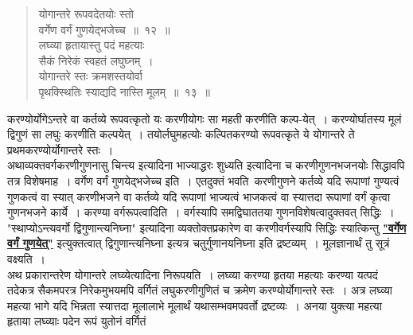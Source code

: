 \documentclass[11pt, openany]{book}
\begin{document}
 \label{12}
\begin{quote}
    \bs
  योगान्तरे रूपवदेतयोः स्तो \\

 \vspace{-7mm}
\hspace{1cm} वर्गेण वर्गं गुणयेद्भजेच्च~॥~१२~॥\\

 \vspace{-5mm}
 लघ्व्या हृतायास्तु पदं महत्याः \\

 \vspace{-7mm}
\hspace{1cm} सैकं निरेकं स्वहतं लघुघ्नम्~। \\

 \vspace{-7mm}
 योगान्तरे स्तः क्रमशस्तयोर्वा \\

 \vspace{-7mm}
\hspace{1cm} पृथक्स्थितिः स्याद्यदि नास्ति मूलम्~॥~१३~॥
\end{quote}

 करण्योर्योगेऽन्तरे वा कर्तव्ये रूपवत्कृतो यः करणीयोगः सा महती 
करणीति कल्प-येत्~। करण्योर्घातस्य मूलं द्विगुणं सा लघुः करणीति कल्पयेत्~।
तयोर्लघुमहत्योः कल्पितकरण्यो रूपवत्कृते ये योगान्तरे ते प्रथमकरण्योर्योगान्तरे स्तः~। \\

\vspace{-3mm}
 अथाव्यक्तवर्गकरणीगुणनासु चिन्त्य इत्यादिना भाज्याद्धरः शुध्यति
इत्यादिना च करणीगुणनभजनयोः सिद्धावपि तत्र विशेषमाह~। वर्गेण वर्गं गुणयेद्भजेच्च इति~। एतदुक्तं भवति\textendash\, करणीगुणने कर्तव्ये यदि रूपाणां
गुण्यत्वं गुणकत्वं वा स्यात् करणीभजने वा कर्तव्ये यदि रूपाणां भाज्यत्वं भाजकत्वं वा स्यात्तदा रूपाणां वर्गं कृत्वा गुणनभजने कार्ये~। करण्या वर्गरूपत्वादिति~।
वर्गस्यापि समद्विघाततया गुणनविशेषत्वादुक्तवत् सिद्धिः~। {\qt "स्थाप्योऽन्त्यवर्गो
द्विगुणान्त्यनिघ्ना"} इत्यादिना व्यक्तोक्तप्रकारेण वा करणीवर्गस्यापि सिद्धिः
स्यात्किन्तु \hyperref[12]{\textbf{"वर्गेण वर्गं गुणयेत्"}} इत्युक्तत्वात् द्विगुणान्त्यनिघ्ना इत्यत्र चतुर्गुणानयनिघ्ना इति द्रष्टव्यम्~। मूलज्ञानार्थं तु सूत्रं वक्ष्यति~। \\

\vspace{-3mm}
 अथ प्रकारान्तरेण योगान्तरे लघ्व्येत्यादिना निरूपयति~। लघ्व्या 
करण्या हृतया महत्याः करण्या यत्पदं तदेकत्र सैकमपरत्र निरेकमुभयमपि 
वर्गितं लघुकरणीगुणितं च क्रमेण करण्योर्योगान्तरे स्तः~। अत्र लघ्व्या 
महत्या भागे यदि भिन्नता स्यात्तदा मूलालाभे मूलार्थं यथासम्भवमपवर्तो 
द्रष्टव्यः~। अनया युक्त्या महत्या हृताया लघ्व्याः पदेन रूपं युतोनं
वर्गितं
\newpage
\end{document}
